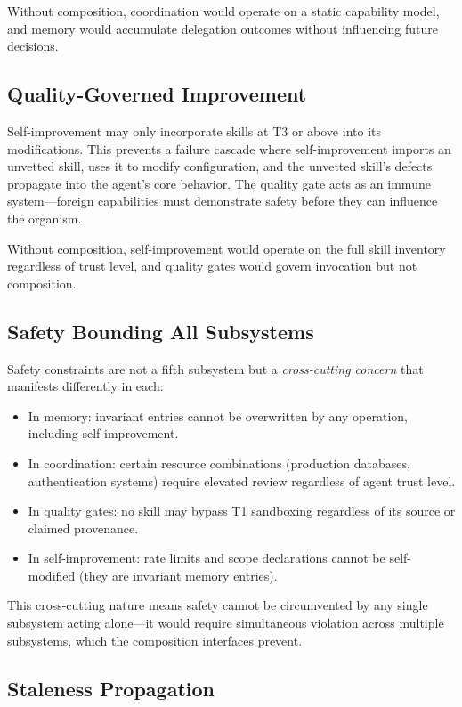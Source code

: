 \documentclass[11pt]{article}
\begin{document}
Without composition, coordination would operate on a static capability model, and memory would accumulate delegation outcomes without influencing future decisions.

\subsection{Quality-Governed Improvement}

Self-improvement may only incorporate skills at T3 or above into its modifications. This prevents a failure cascade where self-improvement imports an unvetted skill, uses it to modify configuration, and the unvetted skill's defects propagate into the agent's core behavior. The quality gate acts as an immune system---foreign capabilities must demonstrate safety before they can influence the organism.

Without composition, self-improvement would operate on the full skill inventory regardless of trust level, and quality gates would govern invocation but not composition.

\subsection{Safety Bounding All Subsystems}

Safety constraints are not a fifth subsystem but a \emph{cross-cutting concern} that manifests differently in each:

\begin{itemize}[nosep]
\item In memory: invariant entries cannot be overwritten by any operation, including self-improvement.
\item In coordination: certain resource combinations (production databases, authentication systems) require elevated review regardless of agent trust level.
\item In quality gates: no skill may bypass T1 sandboxing regardless of its source or claimed provenance.
\item In self-improvement: rate limits and scope declarations cannot be self-modified (they are invariant memory entries).
\end{itemize}

This cross-cutting nature means safety cannot be circumvented by any single subsystem acting alone---it would require simultaneous violation across multiple subsystems, which the composition interfaces prevent.

\subsection{Staleness Propagation}
\end{document}
